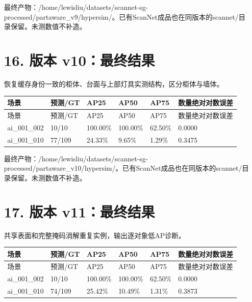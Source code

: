 \documentclass[UTF8,fontset=fandol]{ctexart}
\begin{document}
最终产物：/home/lewisliu/datasets/scannet-sg-processed/partaware\_v9/hypersim/。已有ScanNet成品也在同版本的scannet/目录保留。未测数值不补造。



\section*{16. 版本 v10：最终结果}

恢复缓存身份一致的柜体、台面与上部灯具实测结构，区分柜体与墙体。



{\small
\begin{longtable}{|p{}|p{}|p{}|p{}|p{}|p{}|}
\hline
场景 & 预测/GT & AP25 & AP50 & AP75 & 数量绝对对数误差 \\ \hline
\endfirsthead
\hline
场景 & 预测/GT & AP25 & AP50 & AP75 & 数量绝对对数误差 \\ \hline
\endhead
ai\_001\_002 & 10/10 & 100.00\% & 100.00\% & 62.50\% & 0.0000 \\ \hline
ai\_001\_010 & 77/109 & 24.33\% & 9.65\% & 1.29\% & 0.3475 \\ \hline
\end{longtable}
}

最终产物：/home/lewisliu/datasets/scannet-sg-processed/partaware\_v10/hypersim/。已有ScanNet成品也在同版本的scannet/目录保留。未测数值不补造。



\section*{17. 版本 v11：最终结果}

共享表面和完整掩码消解重复实例，输出逐对象低AP诊断。



{\small
\begin{longtable}{|p{}|p{}|p{}|p{}|p{}|p{}|}
\hline
场景 & 预测/GT & AP25 & AP50 & AP75 & 数量绝对对数误差 \\ \hline
\endfirsthead
\hline
场景 & 预测/GT & AP25 & AP50 & AP75 & 数量绝对对数误差 \\ \hline
\endhead
ai\_001\_002 & 10/10 & 100.00\% & 100.00\% & 62.50\% & 0.0000 \\ \hline
ai\_001\_010 & 74/109 & 25.42\% & 10.49\% & 1.31\% & 0.3873 \\ \hline
\end{longtable}
}
\end{document}
